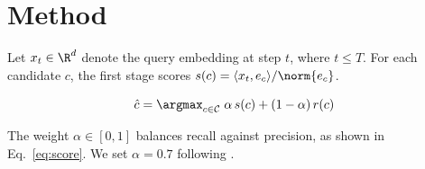 \section{Method}

Let $x_t \in \R^d$ denote the query embedding at step $t$, where $t \le T$.
For each candidate $c$, the first stage scores $s(c) = \langle x_t, e_c \rangle / \norm{e_c}$.

\begin{equation}
\hat{c} = \argmax_{c \in \mathcal{C}} \; \alpha \, s(c) + (1 - \alpha) \, r(c)
\label{eq:score}
\end{equation}

The weight $\alpha \in [0, 1]$ balances recall against precision, as shown in Eq.~\eqref{eq:score}.
We set $\alpha = 0.7$ following \cite{smith2024}.
